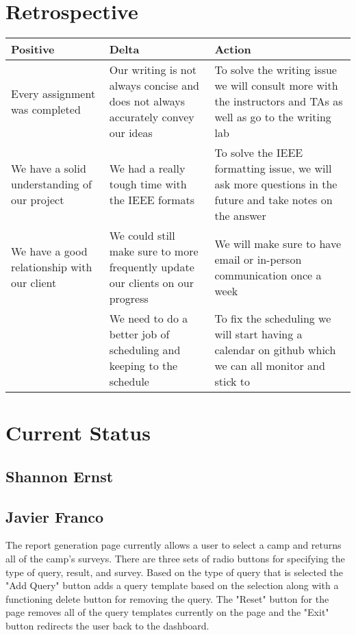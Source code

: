 \documentclass[letterpaper,10pt,serif, draftclsnofoot,onecolumn, compsoc, titlepage]{IEEEtran}
\begin{document}
\section{Retrospective}
\begin{center}
    \begin{tabular}{ | p{5cm} | p{5cm} | p{5cm} |}
    \hline
     Positive & Delta & Action \\ \hline
  	Every assignment was completed & Our writing is not always concise and does not always accurately convey our ideas & To solve the writing issue we will consult more with the instructors and TAs as well as go to the writing lab \\\hline
	We have a solid understanding of our project & We had a really tough time with the IEEE formats & To solve the IEEE formatting issue, we will ask more questions in the future and take notes on the answer \\ \hline
	We have a good relationship with our client & We could still make sure to more frequently update our clients on our progress & We will make sure to have email or in-person communication once a week \\ \hline
	&We need to do a better job of scheduling and keeping to the schedule& To fix the scheduling we will start having a calendar on github which we can all monitor and stick to \\ \hline
    \end{tabular}
\end{center}

\section{Current Status}

\subsection{Shannon Ernst}

\subsection{Javier Franco}
The report generation page currently allows a user to select a camp and returns all of the camp's surveys. There are three sets of radio buttons for specifying the type of query, result, and survey. Based on the type of query that is selected the "Add Query" button adds a query template based on the selection along with a functioning delete button for removing the query. The "Reset" button for the page removes all of the query templates currently on the page and the "Exit" button redirects the user back to the dashboard.
\end{document}
